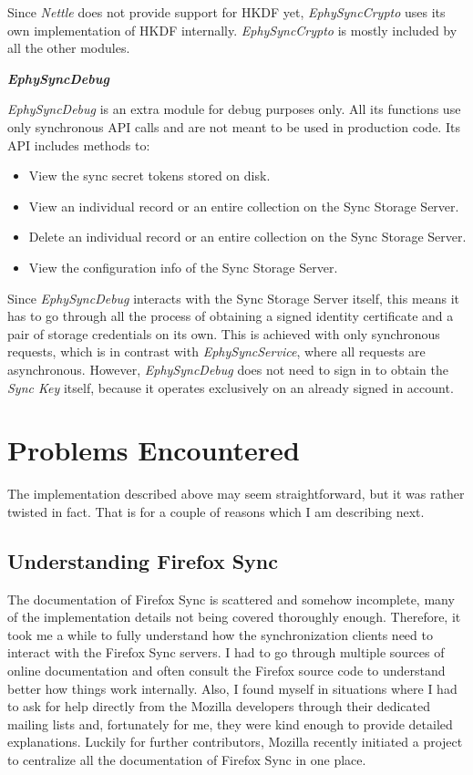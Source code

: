 Since \textit{Nettle} does not provide support for HKDF yet, \textit{EphySyncCrypto} uses its own implementation of HKDF internally. \textit{EphySyncCrypto} is mostly included by all the other modules.

\textbf{\textit{EphySyncDebug}}

\textit{EphySyncDebug} is an extra module for debug purposes only. All its functions use only synchronous API calls and are not meant to be used in production code. Its API includes methods to:

\begin{itemize}
  \item View the sync secret tokens stored on disk.
  \item View an individual record or an entire collection on the Sync Storage Server.
  \item Delete an individual record or an entire collection on the Sync Storage Server.
  \item View the configuration info of the Sync Storage Server.
\end{itemize}

Since \textit{EphySyncDebug} interacts with the Sync Storage Server itself, this means it has to go through all the process of obtaining a signed identity certificate and a pair of storage credentials on its own. This is achieved with only synchronous requests, which is in contrast with \textit{EphySyncService}, where all requests are asynchronous. However, \textit{EphySyncDebug} does not need to sign in to obtain the \textit{Sync Key} itself, because it operates exclusively on an already signed in account.

\section{Problems Encountered}
\label{sec:problems-encountered}

The implementation described above may seem straightforward, but it was rather twisted in fact. That is for a couple of reasons which I am describing next.

\subsection{Understanding Firefox Sync}
\label{sub-sec:understanding-firefox-sync}

The documentation of Firefox Sync is scattered and somehow incomplete, many of the implementation details not being covered thoroughly enough. Therefore, it took me a while to fully understand how the synchronization clients need to interact with the Firefox Sync servers. I had to go through multiple sources of online documentation and often consult the Firefox source code to understand better how things work internally. Also, I found myself in situations where I had to ask for help directly from the Mozilla developers through their dedicated mailing lists and, fortunately for me, they were kind enough to provide detailed explanations. Luckily for further contributors, Mozilla recently initiated a project to centralize all the documentation of Firefox Sync in one place.

